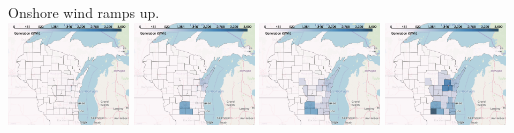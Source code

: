 \documentclass[xcolor=dvipsnames]{beamer}
\begin{document}
\begin{frame}
  Onshore wind ramps up.\\
  \includegraphics[width=0.24\textwidth]{includes/no_leakage_shutdowns_wind_r0.png}
  \includegraphics[width=0.24\textwidth]{includes/no_leakage_shutdowns_wind_r2.png}
  \includegraphics[width=0.24\textwidth]{includes/no_leakage_shutdowns_wind_r3.png}
  \includegraphics[width=0.24\textwidth]{includes/no_leakage_shutdowns_wind_r4.png}
\end{frame}
\end{document}
